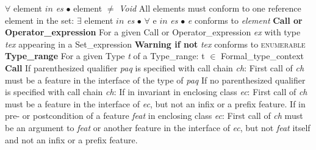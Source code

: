 \indent \indent \indent \indent $\forall$ element $in$ \textit{es} $\bullet$ element $\neq$ \textit{Void}\newline
\indent \indent \indent All elements must conform to one reference element in the set:\newline
\indent \indent \indent \indent $\exists$ element $in$ \textit{es} $\bullet$ $\forall$ e $in$ \textit{es} $\bullet$ \textit{e} conforms to \textit{element}\newline
\indent \indent \textbf{Call or Operator\_expression}\newline
\indent \indent \indent For a given Call or Operator\_expression \textit{ex} with type \textit{tex} appearing in a Set\_expression\newline
\indent \textbf{Warning if not} \newline
\indent \indent \textit{tex} conforms to \textsc{enumerable}\newline
\textbf{Type\_range}\newline
\indent For a given Type \textit{t} of a Type\_range:\newline
\indent t $\in$ Formal\_type\_context\newline
\indent \textbf{Call}\newline
\indent \indent If parenthesized qualifier \textit{paq} is specified with call chain \textit{ch}:\newline
\indent \indent First call of \textit{ch} must be a feature in the interface of the type of \textit{paq}\newline\indent \indent 
\indent \indent If no parenthesized qualifier is specified with call chain \textit{ch}:\newline
\indent \indent \indent If in invariant in enclosing class \textit{ec}:\newline
\indent \indent \indent \indent First call of \textit{ch} must be a feature in the interface of \textit{ec}, but not an infix or a prefix\newline
\indent \indent \indent \indent  feature.\newline
\indent \indent \indent If in pre- or postcondition of a feature \textit{feat} in enclosing class \textit{ec}:\newline
\indent \indent \indent \indent First call of \textit{ch} must be an argument to \textit{feat} or another feature in the interface of \textit{ec}, \newline 
\indent \indent \indent \indent but not \textit{feat} itself and not an infix or a prefix feature.\newline
